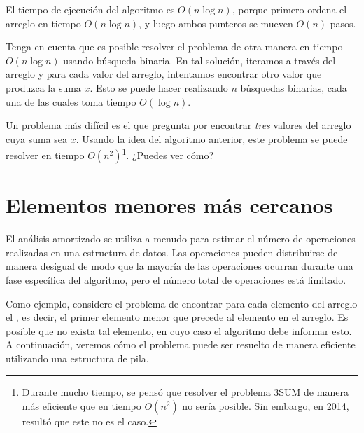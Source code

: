 \begin{center}
\end{center}

El tiempo de ejecución del algoritmo es
$O(n \log n)$, porque primero ordena
el arreglo en tiempo $O(n \log n)$,
y luego ambos punteros se mueven $O(n)$ pasos.

Tenga en cuenta que es posible resolver el problema
de otra manera en tiempo $O(n \log n)$ usando búsqueda binaria.
En tal solución, iteramos a través del arreglo
y para cada valor del arreglo, intentamos encontrar otro
valor que produzca la suma $x$.
Esto se puede hacer realizando $n$ búsquedas binarias,
cada una de las cuales toma tiempo $O(\log n)$.

Un problema más difícil es
el  que pregunta por
encontrar \emph{tres} valores del arreglo
cuya suma sea $x$.
Usando la idea del algoritmo anterior,
este problema se puede resolver en tiempo $O(n^2)$\footnote{Durante mucho tiempo,
se pensó que resolver
el problema 3SUM de manera más eficiente que en tiempo $O(n^2)$
no sería posible.
Sin embargo, en 2014, resultó \cite{gro14}
que este no es el caso.}.
¿Puedes ver cómo?

\section{Elementos menores más cercanos}


El análisis amortizado se utiliza a menudo para
estimar el número de operaciones
realizadas en una estructura de datos.
Las operaciones pueden distribuirse de manera desigual de modo que
la mayoría de las operaciones ocurran durante una
fase específica del algoritmo, pero el número total
de operaciones está limitado.

Como ejemplo, considere el problema
de encontrar para cada elemento del arreglo
el , es decir,
el primer elemento menor que precede al elemento
en el arreglo.
Es posible que no exista tal elemento,
en cuyo caso el algoritmo debe informar esto.
A continuación, veremos cómo el problema puede ser
resuelto de manera eficiente utilizando una estructura de pila.

